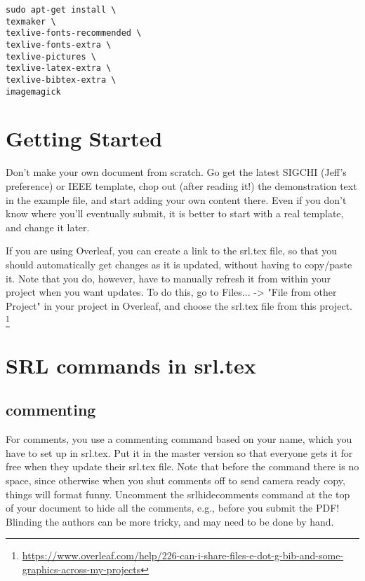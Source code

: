 \documentclass{sigchi}
\begin{document}
\begin{verbatim}
sudo apt-get install \
texmaker \
texlive-fonts-recommended \
texlive-fonts-extra \
texlive-pictures \
texlive-latex-extra \
texlive-bibtex-extra \
imagemagick
\end{verbatim}

\section{Getting Started}
Don't make your own document from scratch.
Go get the latest SIGCHI (Jeff's preference) or IEEE template, chop out (after reading it!) the demonstration text in the example file, and start adding your own content there.
Even if you don't know where you'll eventually submit, it is better to start with a real template, and change it later.

If you are using Overleaf, you can create a link to the srl.tex file, so that you should automatically get changes as it is updated, without having to copy/paste it.
Note that you do, however, have to manually refresh it from within your project when you want updates.
To do this, go to Files... -> "File from other Project" in your project in Overleaf, and choose the srl.tex file from this project.
\footnote{\url{https://www.overleaf.com/help/226-can-i-share-files-e-dot-g-bib-and-some-graphics-across-my-projects}}

\section{SRL commands in srl.tex}



\subsection{commenting}
For comments, you use a commenting command based on your name, which you have to set up in srl.tex.
Put it in the master version so that everyone gets it for free when they update their srl.tex file.
Note that before the command there is no space, since otherwise when you shut comments off to send camera ready copy, things will format funny.
Uncomment the srlhidecomments command at the top of your document to hide all the comments, e.g., before you submit the PDF!
Blinding the authors can be more tricky, and may need to be done by hand.
\end{document}
